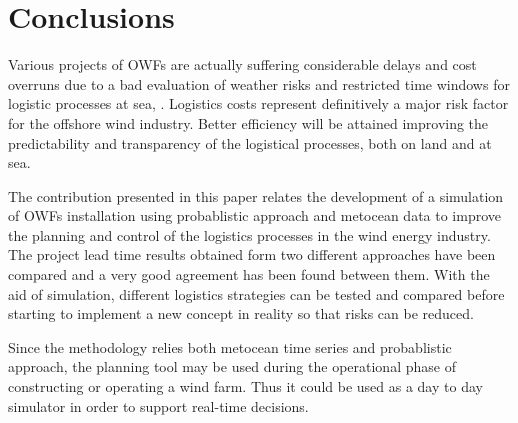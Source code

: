 \section{Conclusions}
Various projects of OWFs are actually suffering considerable delays and cost overruns due to a bad evaluation of weather risks and restricted time windows for logistic processes at sea, \cite{TCE12, ISOPE2013}. Logistics costs represent definitively a major risk factor for the offshore wind industry. Better efficiency will be attained improving the predictability and transparency of the logistical processes, both on land and at sea.

The contribution presented in this paper relates the development of a simulation of OWFs installation using probablistic approach and metocean data to improve the planning and control of the logistics processes in the wind energy industry. The project lead time results obtained form two different approaches have been compared and a very good agreement has been found between them. With the aid of simulation, different logistics strategies can be tested and compared before starting to implement a new concept in reality so that risks can be reduced.

Since the methodology relies both metocean time series and probablistic approach, the planning tool may be used during the operational phase of constructing or operating a wind farm. Thus it could be used as a day to day simulator in order to support real-time decisions.
